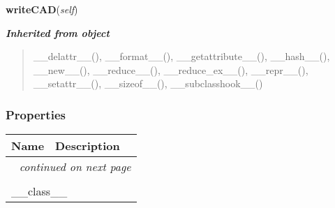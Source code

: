     \vspace{0.5ex}

\hspace{.8\funcindent}\begin{boxedminipage}{\funcwidth}

    \raggedright \textbf{writeCAD}(\textit{self})

\setlength{\parskip}{2ex}
\setlength{\parskip}{1ex}
    \end{boxedminipage}


\large{\textbf{\textit{Inherited from object}}}

\begin{quote}
\_\_delattr\_\_(), \_\_format\_\_(), \_\_getattribute\_\_(), \_\_hash\_\_(), \_\_new\_\_(), \_\_reduce\_\_(), \_\_reduce\_ex\_\_(), \_\_repr\_\_(), \_\_setattr\_\_(), \_\_sizeof\_\_(), \_\_subclasshook\_\_()
\end{quote}


  \subsubsection{Properties}

    \vspace{-1cm}
\hspace{\varindent}\begin{longtable}{|p{\varnamewidth}|p{\vardescrwidth}|l}
\cline{1-2}
\cline{1-2} \centering \textbf{Name} & \centering \textbf{Description}& \\
\cline{1-2}
\endhead\cline{1-2}\multicolumn{3}{r}{\small\textit{continued on next page}}\\\endfoot\cline{1-2}
\endlastfoot\multicolumn{2}{|l|}{\textit{Inherited from object}}\\
\multicolumn{2}{|p{\varwidth}|}{\raggedright \_\_class\_\_}\\
\cline{1-2}
\end{longtable}

